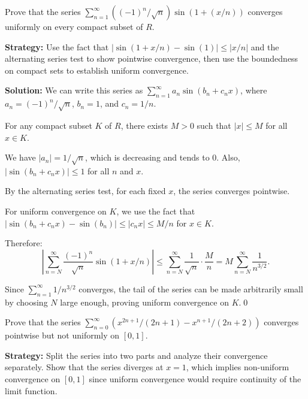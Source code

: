 \begin{problembox}
\begin{problemstatement}
Prove that the series \(\sum_{n=1}^{\infty} ((-1)^n/\sqrt{n}) \sin (1 + (x/n))\) converges uniformly on every compact subset of \( R \).
\end{problemstatement}
\end{problembox}

\noindent\textbf{Strategy:} Use the fact that \( |\sin(1 + x/n) - \sin(1)| \leq |x/n| \) and the alternating series test to show pointwise convergence, then use the boundedness on compact sets to establish uniform convergence.

\bigskip\noindent\textbf{Solution:} We can write this series as \( \sum_{n=1}^{\infty} a_n \sin(b_n + c_n x) \), where \( a_n = (-1)^n/\sqrt{n} \), \( b_n = 1 \), and \( c_n = 1/n \).

For any compact subset \( K \) of \( R \), there exists \( M > 0 \) such that \( |x| \leq M \) for all \( x \in K \).

We have \( |a_n| = 1/\sqrt{n} \), which is decreasing and tends to 0. Also, \( |\sin(b_n + c_n x)| \leq 1 \) for all \( n \) and \( x \).

By the alternating series test, for each fixed \( x \), the series converges pointwise.

For uniform convergence on \( K \), we use the fact that \( |\sin(b_n + c_n x) - \sin(b_n)| \leq |c_n x| \leq M/n \) for \( x \in K \).

Therefore:
\[\left|\sum_{n=N}^{\infty} \frac{(-1)^n}{\sqrt{n}} \sin(1 + x/n)\right| \leq \sum_{n=N}^{\infty} \frac{1}{\sqrt{n}} \cdot \frac{M}{n} = M \sum_{n=N}^{\infty} \frac{1}{n^{3/2}}.\]

Since \( \sum_{n=1}^{\infty} 1/n^{3/2} \) converges, the tail of the series can be made arbitrarily small by choosing \( N \) large enough, proving uniform convergence on \( K \).\qed


\begin{problembox}
\begin{problemstatement}
Prove that the series \(\sum_{n=0}^{\infty} (x^{2n+1}/(2n + 1) - x^{n+1}/(2n + 2))\) converges pointwise but not uniformly on \([0, 1]\).
\end{problemstatement}
\end{problembox}

\noindent\textbf{Strategy:} Split the series into two parts and analyze their convergence separately. Show that the series diverges at \( x = 1 \), which implies non-uniform convergence on \([0, 1]\) since uniform convergence would require continuity of the limit function.

